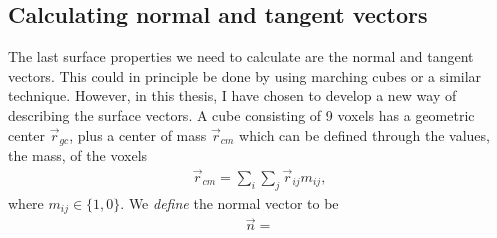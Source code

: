 \subsection{Calculating normal and tangent vectors}
The last surface properties we need to calculate are the normal and tangent vectors. This could in principle be done by using marching cubes \cite{article:marching_cubes_original} or a similar technique. However, in this thesis, I have chosen to develop a new way of describing the surface vectors. A cube consisting of 9 voxels has a geometric center $\vec r_{gc}$, plus a center of mass $\vec r_{cm}$ which can be defined through the values, the mass, of the voxels
\begin{align}
	\vec r_{cm} = \sum_i\sum_j \vec r_{ij}m_{ij},
\end{align}
where $m_{ij} \in \{1,0\}$. We \textit{define} the normal vector to be 
\begin{align}
	\vec n = 
\end{align}